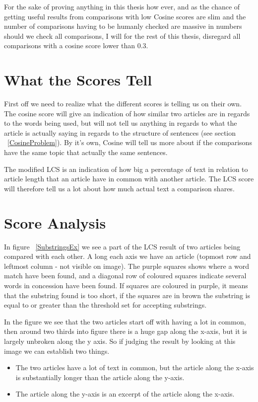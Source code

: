 For the sake of proving anything in this thesis how ever, and as the chance of getting useful results from comparisons with low Cosine scores are slim and the number of comparisons having to be humanly checked are massive in numbers should we check all comparisons, I will for the rest of this thesis, disregard all comparisons with a cosine score lower than 0.3.

\section{What the Scores Tell}
First off we need to realize what the different scores is telling us on their own. The cosine score will give an indication of how similar two articles are in regards to the words being used, but will not tell us anything in regards to what the article is actually saying in regards to the structure of sentences (see section ~\ref{CosineProblem}). By it's own, Cosine will tell us more about if the comparisons have the same topic that actually the same sentences. 

The modified LCS is an indication of how big a percentage of text in relation to article length that an article have in common with another article. The LCS score will therefore tell us a lot about how much actual text a comparison shares. 

\section{Score Analysis}

In figure ~\ref{SubstringsEx} we see a part of the LCS result of two articles being compared with each other. A long each axis we have an article (topmost row and leftmost column - not visible on image). The purple squares shows where a word match have been found, and a diagonal row of coloured squares indicate several words in concession have been found. If squares are coloured in purple, it means that the substring found is too short, if the squares are in brown the substring is equal to or greater than the threshold set for accepting substrings.

In the figure we see that the two articles start off with having a lot in common, then around two thirds into figure there is a huge gap along the x-axis, but it is largely unbroken along the y axis. So if judging the result by looking at this image we can establish two things.

\begin{itemize}
\item The two articles have a lot of text in common, but the article along the x-axis is substantially longer than the article along the y-axis.
\item The article along the y-axis is an excerpt of the article along the x-axis.
\end{itemize}

